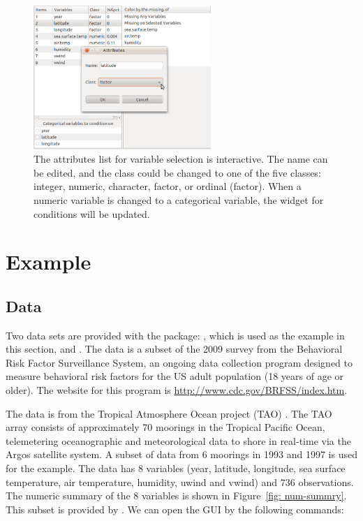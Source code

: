 \documentclass[article]{jss}
\begin{document}
\begin{center}
\begin{figure}[h]
\begin{centering}
\includegraphics[width=0.6\textwidth]{graph/fig8-query}
\par\end{centering}
\caption{The attributes list for variable selection is interactive. The name can be edited, and the class could be changed to one of the five classes: integer, numeric, character, factor, or ordinal (factor). When a numeric variable is changed to a categorical variable, the widget for conditions will be updated.}
\label{fig: attributes}
\end{figure}
\par\end{center}

\section{Example}\label{Examples}

\subsection{Data}

Two data sets are provided with the package: , which is used as the example in this section, and . The  data is a subset of the 2009 survey from the Behavioral Risk Factor Surveillance System, an ongoing data collection program designed to measure behavioral risk factors for the US adult population (18 years of age or older). The website for this program is \url{http://www.cdc.gov/BRFSS/index.htm}.

The data  is from the Tropical Atmosphere Ocean project (TAO) \citep{tao}. The TAO array consists of approximately 70 moorings in the Tropical Pacific Ocean, telemetering oceanographic and meteorological data to shore in real-time via the Argos satellite system. A subset of data from 6 moorings in 1993 and 1997 is used for the example. The data has 8 variables (year, latitude, longitude, sea surface temperature, air temperature, humidity, uwind and vwind) and 736 observations. The numeric summary of the 8 variables is shown in Figure~\ref{fig: num-summry}. This subset is provided by \citet{CS07}. We can open the GUI by the following commands:
\end{document}

